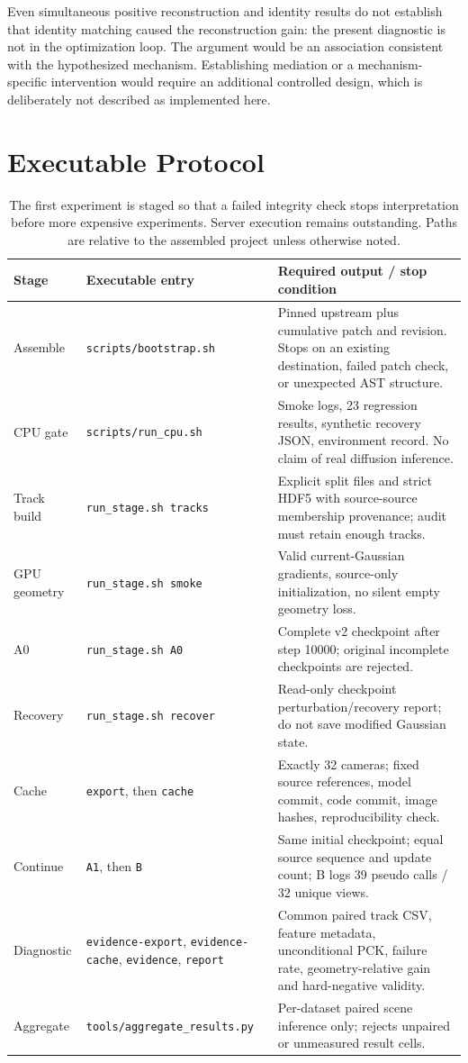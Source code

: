 \documentclass[10pt,twocolumn,letterpaper]{article}
\begin{document}
Even simultaneous positive reconstruction and identity results do not establish that identity matching caused the reconstruction gain: the present diagnostic is not in the optimization loop. The argument would be an association consistent with the hypothesized mechanism. Establishing mediation or a mechanism-specific intervention would require an additional controlled design, which is deliberately not described as implemented here.

\section{Executable Protocol}
\begin{table}[t]
\centering\small
\begin{tabularx}{\textwidth}{p{}p{}X}
\toprule
Stage & Executable entry & Required output / stop condition\\
\midrule
Assemble & \texttt{scripts/bootstrap.sh} & Pinned upstream plus cumulative patch and revision. Stops on an existing destination, failed patch check, or unexpected AST structure.\\
CPU gate & \texttt{scripts/run\_cpu.sh} & Smoke logs, 23 regression results, synthetic recovery JSON, environment record. No claim of real diffusion inference.\\
Track build & \texttt{run\_stage.sh tracks} & Explicit split files and strict HDF5 with source-source membership provenance; audit must retain enough tracks.\\
GPU geometry & \texttt{run\_stage.sh smoke} & Valid current-Gaussian gradients, source-only initialization, no silent empty geometry loss.\\
A0 & \texttt{run\_stage.sh A0} & Complete v2 checkpoint after step 10000; original incomplete checkpoints are rejected.\\
Recovery & \texttt{run\_stage.sh recover} & Read-only checkpoint perturbation/recovery report; do not save modified Gaussian state.\\
Cache & \texttt{export}, then \texttt{cache} & Exactly 32 cameras; fixed source references, model commit, code commit, image hashes, reproducibility check.\\
Continue & \texttt{A1}, then \texttt{B} & Same initial checkpoint; equal source sequence and update count; B logs 39 pseudo calls / 32 unique views.\\
Diagnostic & \texttt{evidence-export}, \texttt{evidence-cache}, \texttt{evidence}, \texttt{report} & Common paired track CSV, feature metadata, unconditional PCK, failure rate, geometry-relative gain and hard-negative validity.\\
Aggregate & \texttt{tools/aggregate\_results.py} & Per-dataset paired scene inference only; rejects unpaired or unmeasured result cells.\\
\bottomrule
\end{tabularx}
\caption{The first experiment is staged so that a failed integrity check stops interpretation before more expensive experiments. Server execution remains outstanding. Paths are relative to the assembled project unless otherwise noted.}
\end{table}
\end{document}
